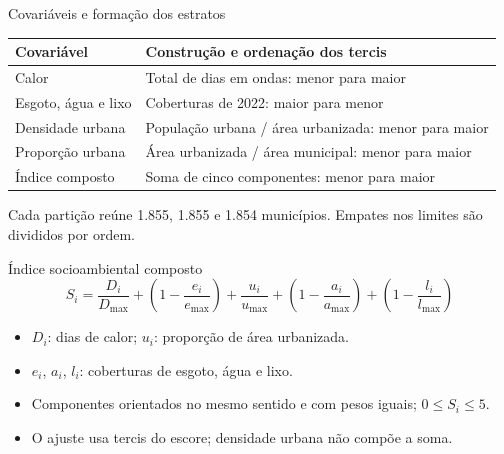 \documentclass[aspectratio=169,11pt]{beamer}
\begin{document}
\begin{frame}{Covariáveis e formação dos estratos}
\small\begin{tabularx}{\textwidth}{@{}p{3.0cm}X@{}}\toprule
Covariável & Construção e ordenação dos tercis\\\midrule
Calor & Total de dias em ondas: menor para maior\\
Esgoto, água e lixo & Coberturas de 2022: maior para menor\\
Densidade urbana & População urbana / área urbanizada: menor para maior\\
Proporção urbana & Área urbanizada / área municipal: menor para maior\\
Índice composto & Soma de cinco componentes: menor para maior\\\bottomrule\end{tabularx}\par\vspace{0.25cm}\noindent\normalsize Cada partição reúne 1.855, 1.855 e 1.854 municípios. Empates nos limites são divididos por ordem.
\end{frame}

\begin{frame}{Índice socioambiental composto}
\[
S_i=\frac{D_i}{D_{\max}}+
\left(1-\frac{e_i}{e_{\max}}\right)+\frac{u_i}{u_{\max}}
+\left(1-\frac{a_i}{a_{\max}}\right)+
\left(1-\frac{l_i}{l_{\max}}\right)
\]
\begin{itemize}
\item $D_i$: dias de calor; $u_i$: proporção de área urbanizada.
\item $e_i$, $a_i$, $l_i$: coberturas de esgoto, água e lixo.
\item Componentes orientados no mesmo sentido e com pesos iguais; $0\leq S_i\leq5$.
\item O ajuste usa tercis do escore; densidade urbana não compõe a soma.
\end{itemize}
\end{frame}
\end{document}
